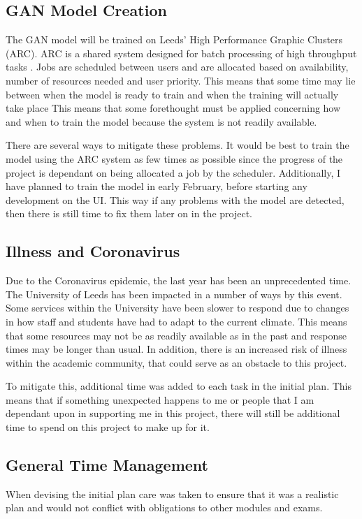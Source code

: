 \subsection{GAN Model Creation}
\label{subsec:ganmodelcreation}
The GAN model will be trained on Leeds’ High Performance Graphic Clusters (ARC). ARC is a shared system designed for batch processing of high throughput tasks \cite{arcleeds}. Jobs are scheduled between users and are allocated based on availability, number of resources needed and user priority. This means that some time may lie between when the model is ready to train and when the training will actually take place This means that some forethought must be applied concerning how and when to train the model because the system is not readily available. 

\noindent There are several ways to mitigate these problems. It would be best to train the model using the ARC system as few times as possible since the progress of the project is dependant on being allocated a job by the scheduler. Additionally, I have planned to train the model in early February, before starting any development on the UI. This way if any problems with the model are detected, then there is still time to fix them later on in the project. 

\subsection{Illness and Coronavirus}
\label{subsec:illnessandconronavirus}
Due to the Coronavirus epidemic, the last year has been an unprecedented time. The University of Leeds has been impacted in a number of ways by this event. Some services within the University have been slower to respond due to changes in how staff and students have had to adapt to the current climate. This means that some resources may not be as readily available as in the past and response times may be longer than usual. In addition, there is an increased risk of illness within the academic community, that could serve as an obstacle to this project.

\noindent To mitigate this, additional time was added to each task in the initial plan. This means that if something unexpected happens to me or people that I am dependant upon in supporting me in this project, there will still be additional time to spend on this project to make up for it.
\subsection{General Time Management}
\label{subsec:generaltimemanagement}
When devising the initial plan care was taken to ensure that it was a realistic plan and would not conflict with obligations to other modules and exams.
